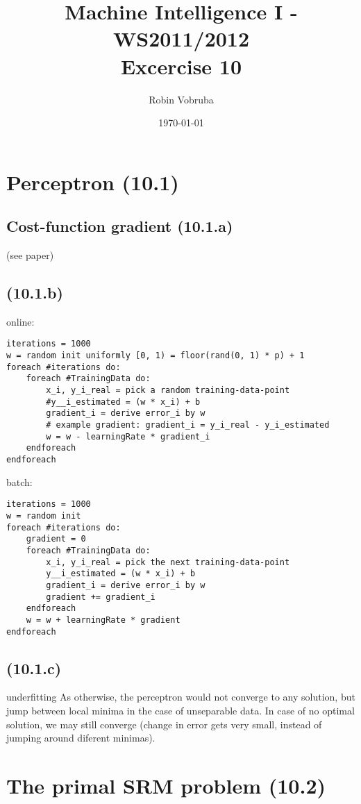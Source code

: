 \documentclass[a4paper,headings=small]{scrartcl}
\title{Machine Intelligence I - WS2011/2012\\Excercise 10}
\author{Robin Vobruba} %
\date{\today}
\begin{document}
\maketitle

\section{Perceptron (10.1)}

\subsection{Cost-function gradient (10.1.a)}

(see paper)

\subsection{ (10.1.b)}

online:
\begin{verbatim}
iterations = 1000
w = random init uniformly [0, 1) = floor(rand(0, 1) * p) + 1
foreach #iterations do:
	foreach #TrainingData do:
		x_i, y_i_real = pick a random training-data-point
		#y__i_estimated = (w * x_i) + b
		gradient_i = derive error_i by w
		# example gradient: gradient_i = y_i_real - y_i_estimated
		w = w - learningRate * gradient_i
	endforeach
endforeach
\end{verbatim}

batch:
\begin{verbatim}
iterations = 1000
w = random init
foreach #iterations do:
	gradient = 0
	foreach #TrainingData do:
		x_i, y_i_real = pick the next training-data-point
		y__i_estimated = (w * x_i) + b
		gradient_i = derive error_i by w
		gradient += gradient_i
	endforeach
	w = w + learningRate * gradient
endforeach
\end{verbatim}



\subsection{ (10.1.c)}
underfitting
As otherwise, the perceptron would not converge to any solution,
but jump between local minima in the case of unseparable data.
In case of no optimal solution, we may still converge (change in error gets very small, instead of jumping around diferent minimas).

\section{The primal SRM problem (10.2)}
\end{document}

